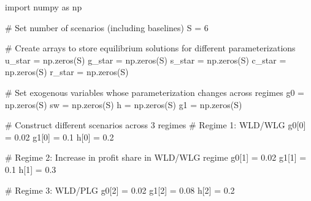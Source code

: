 \documentclass[
  letterpaper,
  DIV=11,
  numbers=noendperiod]{scrreprt}
\newenvironment{Shaded}{\begin{snugshade}}{\end{snugshade}}
\newcommand{\CommentTok}[1]{\textcolor[rgb]{0.37,0.37,0.37}{#1}}
\newcommand{\DecValTok}[1]{\textcolor[rgb]{0.68,0.00,0.00}{#1}}
\newcommand{\FloatTok}[1]{\textcolor[rgb]{0.68,0.00,0.00}{#1}}
\newcommand{\ImportTok}[1]{\textcolor[rgb]{0.00,0.46,0.62}{#1}}
\newcommand{\NormalTok}[1]{\textcolor[rgb]{0.00,0.23,0.31}{#1}}
\newcommand{\OperatorTok}[1]{\textcolor[rgb]{0.37,0.37,0.37}{#1}}
\begin{document}
\begin{tcolorbox}[enhanced jigsaw, titlerule=0mm, breakable, bottomrule=.15mm, toprule=.15mm, colbacktitle=quarto-callout-note-color!10!white, rightrule=.15mm, toptitle=1mm, opacityback=0, left=2mm, coltitle=black, title=\textcolor{quarto-callout-note-color}{\faInfo}\hspace{0.5em}{Python code}, colframe=quarto-callout-note-color-frame, opacitybacktitle=0.6, leftrule=.75mm, bottomtitle=1mm, arc=.35mm, colback=white]

\begin{Shaded}
\begin{Highlighting}[]
\ImportTok{import}\NormalTok{ numpy }\ImportTok{as}\NormalTok{ np}

\CommentTok{\# Set number of scenarios (including baselines)}
\NormalTok{S }\OperatorTok{=} \DecValTok{6}

\CommentTok{\# Create arrays to store equilibrium solutions for different parameterizations}
\NormalTok{u\_star }\OperatorTok{=}\NormalTok{ np.zeros(S)}
\NormalTok{g\_star }\OperatorTok{=}\NormalTok{ np.zeros(S)}
\NormalTok{s\_star }\OperatorTok{=}\NormalTok{ np.zeros(S)}
\NormalTok{c\_star }\OperatorTok{=}\NormalTok{ np.zeros(S)}
\NormalTok{r\_star }\OperatorTok{=}\NormalTok{ np.zeros(S)}

\CommentTok{\# Set exogenous variables whose parameterization changes across regimes}
\NormalTok{g0 }\OperatorTok{=}\NormalTok{ np.zeros(S)}
\NormalTok{sw }\OperatorTok{=}\NormalTok{ np.zeros(S)}
\NormalTok{h }\OperatorTok{=}\NormalTok{ np.zeros(S)}
\NormalTok{g1 }\OperatorTok{=}\NormalTok{ np.zeros(S)}

\CommentTok{\# Construct different scenarios across 3 regimes}
\CommentTok{\# Regime 1: WLD/WLG}
\NormalTok{g0[}\DecValTok{0}\NormalTok{] }\OperatorTok{=} \FloatTok{0.02}
\NormalTok{g1[}\DecValTok{0}\NormalTok{] }\OperatorTok{=} \FloatTok{0.1}
\NormalTok{h[}\DecValTok{0}\NormalTok{] }\OperatorTok{=} \FloatTok{0.2}

\CommentTok{\# Regime 2: Increase in profit share in WLD/WLG regime}
\NormalTok{g0[}\DecValTok{1}\NormalTok{] }\OperatorTok{=} \FloatTok{0.02}
\NormalTok{g1[}\DecValTok{1}\NormalTok{] }\OperatorTok{=} \FloatTok{0.1}
\NormalTok{h[}\DecValTok{1}\NormalTok{] }\OperatorTok{=} \FloatTok{0.3}

\CommentTok{\# Regime 3: WLD/PLG}
\NormalTok{g0[}\DecValTok{2}\NormalTok{] }\OperatorTok{=} \FloatTok{0.02}
\NormalTok{g1[}\DecValTok{2}\NormalTok{] }\OperatorTok{=} \FloatTok{0.08}
\NormalTok{h[}\DecValTok{2}\NormalTok{] }\OperatorTok{=} \FloatTok{0.2}


\end{Highlighting}
\end{Shaded}
\end{tcolorbox}
\end{document}
